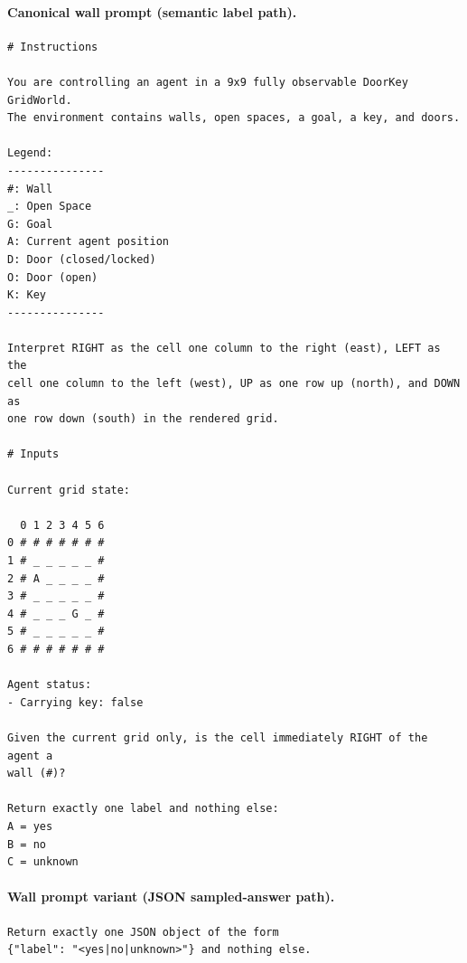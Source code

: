 \documentclass[11pt,a4paper]{article}
\begin{document}
\paragraph{Canonical wall prompt (semantic label path).}
\begin{verbatim}
# Instructions

You are controlling an agent in a 9x9 fully observable DoorKey GridWorld.
The environment contains walls, open spaces, a goal, a key, and doors.

Legend:
---------------
#: Wall
_: Open Space
G: Goal
A: Current agent position
D: Door (closed/locked)
O: Door (open)
K: Key
---------------

Interpret RIGHT as the cell one column to the right (east), LEFT as the
cell one column to the left (west), UP as one row up (north), and DOWN as
one row down (south) in the rendered grid.

# Inputs

Current grid state:

  0 1 2 3 4 5 6
0 # # # # # # #
1 # _ _ _ _ _ #
2 # A _ _ _ _ #
3 # _ _ _ _ _ #
4 # _ _ _ G _ #
5 # _ _ _ _ _ #
6 # # # # # # #

Agent status:
- Carrying key: false

Given the current grid only, is the cell immediately RIGHT of the agent a
wall (#)?

Return exactly one label and nothing else:
A = yes
B = no
C = unknown
\end{verbatim}

\paragraph{Wall prompt variant (JSON sampled-answer path).}
\begin{verbatim}
Return exactly one JSON object of the form
{"label": "<yes|no|unknown>"} and nothing else.
\end{verbatim}
\end{document}
